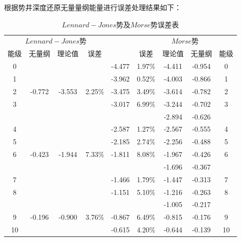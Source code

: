 \documentclass[11pt, a4paper, oneside]{ctexart}
\begin{document}
{{{{    根据势井深度还原无量量纲能量进行误差处理结果如下：
    \newpage
    {
\begin{table}[!h]
    \caption{$Lennard −Jones$势及$Morse$势误差表}
    \begin{tabular}{@{}c|c|c|c|c|c|c|c|c@{}}
    \toprule
    \multicolumn{4}{c|}{$Lennard −Jones$势} & {\multirow{2}{*}{能级实验值}} & \multicolumn{4}{c}{$Morse$势}       \\\cline{1-4}   \cline{6-9}
    能级  & 无量纲     & 理论值     & 误差       &                        & 误差       & 理论值    & 无量纲    & 能级 \\\hline
    0   &         &         &          & -4.477                 & 1.97\%   & -4.411 & -0.954 & 0  \\
    1   &         &         &          & -3.962                 & 0.52\%   & -4.003 & -0.866 & 1  \\
    2   & -0.772  & -3.553  & 2.25\%   & -3.475                 & 3.49\%   & -3.614 & -0.782 & 2  \\
    3   &         &         &          & -3.017                 & 6.99\%   & -3.244 & -0.702 & 3  \\
        &         &         &          &                        &          & -2.894 & -0.626 &    \\
    4   &         &         &          & -2.587                 & 1.27\%   & -2.567 & -0.555 & 4  \\
    5   &         &         &          & -2.185                 & 2.74\%   & -2.256 & -0.488 & 5  \\
    6   & -0.423  & -1.944  & 7.33\%   & -1.811                 & 8.08\%   & -1.967 & -0.426 & 6  \\
        &         &         &          &                        &          & -1.696 & -0.367 &    \\
    7   &         &         &          & -1.466                 & 1.79\%   & -1.447 & -0.313 & 7  \\
    8   &         &         &          & -1.151                 & 5.10\%   & -1.216 & -0.263 & 8  \\
        &         &         &          &                        &          & -1.005 & -0.217 &    \\
    9   & -0.196  & -0.900  & 3.76\%   & -0.867                 & 6.49\%   & -0.815 & -0.176 & 9  \\
    10  &         &         &          & -0.615                 & 4.20\%   & -0.644 & -0.139 & 10 \\

\end{tabular}
\end{table}}}}}}
\end{document}
